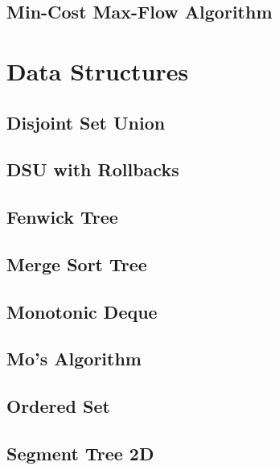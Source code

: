 \subsection{Min-Cost Max-Flow Algorithm}
\raggedbottom
\hrulefill

\section{Data Structures}
\subsection{Disjoint Set Union}
\raggedbottom
\hrulefill
\subsection{DSU with Rollbacks}
\raggedbottom
\hrulefill
\subsection{Fenwick Tree}
\raggedbottom
\hrulefill
\subsection{Merge Sort Tree}
\raggedbottom
\hrulefill
\subsection{Monotonic Deque}
\raggedbottom
\hrulefill
\subsection{Mo's Algorithm}
\raggedbottom
\hrulefill
\subsection{Ordered Set}
\raggedbottom
\hrulefill
\subsection{Segment Tree 2D}
\raggedbottom
\hrulefill
